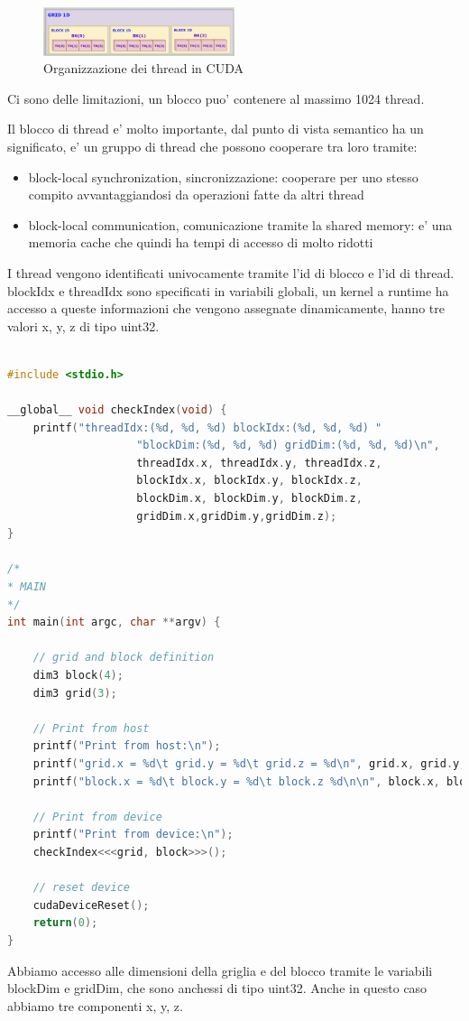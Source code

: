 \begin{figure}[ht!]
    \centering
    \includegraphics[width=0.5\textwidth]{images/organizzazioneThread.png}
    \caption{Organizzazione dei thread in CUDA}
\end{figure}

Ci sono delle limitazioni, un blocco puo' contenere al massimo 1024 thread.

Il blocco di thread e' molto importante, dal punto di vista semantico ha un significato, e' un gruppo di thread che possono cooperare tra loro tramite:
\begin{itemize}
    \item block-local synchronization, sincronizzazione: cooperare per uno stesso compito avvantaggiandosi da operazioni fatte da altri thread
    \item block-local communication, comunicazione tramite la shared memory: e' una memoria cache che quindi ha tempi di accesso di molto ridotti
\end{itemize}

I thread vengono identificati univocamente tramite l'id di blocco e l'id di thread. blockIdx e threadIdx sono specificati in variabili globali, un kernel a runtime ha accesso a queste informazioni che vengono assegnate dinamicamente, hanno tre valori x, y, z di tipo uint32.

\begin{lstlisting}[language=C]
    
#include <stdio.h>

__global__ void checkIndex(void) {
	printf("threadIdx:(%d, %d, %d) blockIdx:(%d, %d, %d) "
					"blockDim:(%d, %d, %d) gridDim:(%d, %d, %d)\n",
					threadIdx.x, threadIdx.y, threadIdx.z,
					blockIdx.x, blockIdx.y, blockIdx.z,
					blockDim.x, blockDim.y, blockDim.z,
					gridDim.x,gridDim.y,gridDim.z);
}

/*
* MAIN
*/
int main(int argc, char **argv) {

	// grid and block definition
	dim3 block(4);
	dim3 grid(3);

	// Print from host
	printf("Print from host:\n");
	printf("grid.x = %d\t grid.y = %d\t grid.z = %d\n", grid.x, grid.y, grid.z);
	printf("block.x = %d\t block.y = %d\t block.z %d\n\n", block.x, block.y, block.z);

	// Print from device
	printf("Print from device:\n");
	checkIndex<<<grid, block>>>();

	// reset device
	cudaDeviceReset();
	return(0);
}
\end{lstlisting}
Abbiamo accesso alle dimensioni della griglia e del blocco tramite le variabili blockDim e gridDim, che sono anchessi di tipo uint32. Anche in questo caso abbiamo tre componenti x, y, z.

